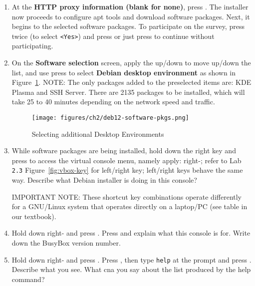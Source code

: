 \begin{enumerate}
\item At the {\bf{HTTP proxy information (blank for none)}}, press {}. The installer now proceeds to configure apt tools and download software packages. Next, it begins to the selected software packages. To participate on the survey, press {} twice (to select {\tt{<Yes>}}) and press {} or just press {} to continue without participating.   

\item On the {\bf{Software selection}} screen, apply the up/down to move up/down the list, and use press {} to select {\bf{Debian desktop environment}} as shown in Figure~\ref{fig:deb12-software-pkgs}. NOTE: The only packages added to the preselected items are: KDE Plasma and SSH Server. There are 2135 packages to be installed, which will take 25 to 40 minutes depending on the network speed and traffic. 

\begin{figure}[hbt!]\centering
   \texttt{[image: figures/ch2/deb12-software-pkgs.png]}
   \caption{Selecting additional Desktop Environments} \label{fig:deb12-software-pkgs} %
\end{figure}

\item {\label{start:l2.5}} While software packages are being installed, hold down the right {} key and press {} to access the virtual console menu, namely apply: right-{}; refer to Lab {\tt{2.3}} Figure~\ref{fig:vbox-key} for left/right {} key; left/right {} keys behave the same way. Describe what Debian installer is doing in this console? 

\vspace{0.35in} 

IMPORTANT NOTE: These shortcut key combinations operate differently for a GNU/Linux system that operates directly on a laptop/PC (see table in our textbook).

\item Hold down right-{} and press {}. Press {} and explain what this console is for. Write down the BusyBox version number. 

\vspace{0.25in}

\item Hold down right-{} and press {}. Press {}, then type {\tt{help}} at the prompt and press {}. Describe what you see. What cna you say about the list produced by the help command? 


\end{enumerate}

